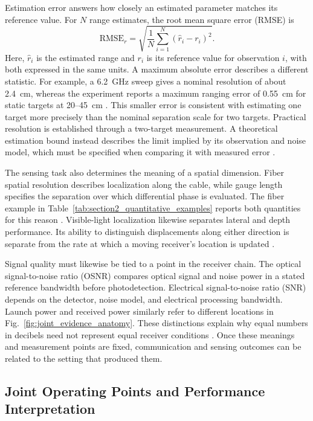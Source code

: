 Estimation error answers how closely an estimated parameter matches its
reference value. For $N$ range estimates, the root mean square error (RMSE) is
\begin{equation}
\mathrm{RMSE}_{r}=
\sqrt{\frac{1}{N}\sum_{i=1}^{N}(\hat r_i-r_i)^2}.
\label{eq:ranging_rmse}
\end{equation}
Here, $\hat r_i$ is the estimated range and $r_i$ is its reference value for
observation $i$, with both expressed in the same units.
A maximum absolute error describes a different statistic. For example, a 6.2~GHz sweep gives a nominal resolution of about 2.4~cm,
whereas the experiment reports a maximum ranging error of 0.55~cm for static
targets at 20--45~cm \cite{OISAC_SCR00083}. This smaller error is consistent
with estimating one target more precisely than the nominal separation scale
for two targets. Practical resolution is established through a two-target
measurement. A theoretical estimation bound instead describes the limit
implied by its observation and noise model, which must be specified when
comparing it with measured error \cite{Wen2024OISACArchitectures}.

The sensing task also determines the meaning of a spatial dimension.
Fiber spatial resolution describes localization along the cable, while gauge
length specifies the separation over which differential phase is evaluated.
The fiber example in Table~\ref{tab:section2_quantitative_examples} reports
both quantities for this reason \cite{OISAC_SCR00057}.
Visible-light localization likewise separates lateral and depth performance.
Its ability to distinguish displacements along either direction is separate
from the rate at which a moving receiver's location is updated
\cite{OISAC_SCR00196}.

Signal quality must likewise be tied to a point in the receiver chain.
The optical signal-to-noise ratio (OSNR) compares optical signal and
noise power in a stated reference bandwidth before photodetection. Electrical
signal-to-noise ratio (SNR) depends on the detector, noise model, and electrical processing bandwidth.
Launch power and received power similarly refer to different locations in
Fig.~\ref{fig:joint_evidence_anatomy}. These distinctions explain why equal
numbers in decibels need not represent equal receiver conditions
\cite{OISAC_SCR00220,OISAC_SCR01180}.
Once these meanings and measurement points are fixed, communication and
sensing outcomes can be related to the setting that produced them.

\subsection{Joint Operating Points and Performance Interpretation}
\label{sec:joint_performance_interpretation}

